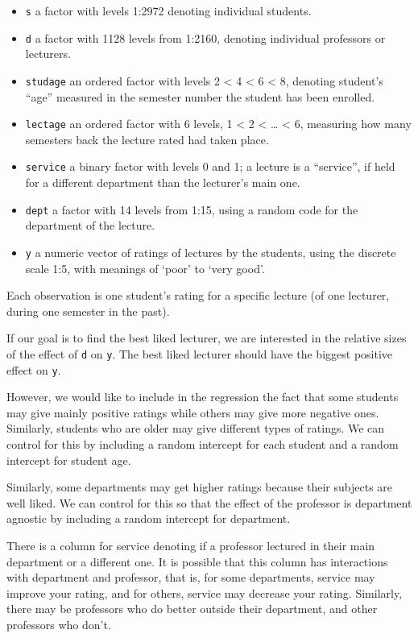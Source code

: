 \documentclass[
]{article}
\begin{document}
\begin{itemize}
\item
  \texttt{s} a factor with levels 1:2972 denoting individual students.
\item
  \texttt{d} a factor with 1128 levels from 1:2160, denoting individual
  professors or lecturers.
\item
  \texttt{studage} an ordered factor with levels 2 \textless{} 4
  \textless{} 6 \textless{} 8, denoting student's ``age'' measured in
  the semester number the student has been enrolled.
\item
  \texttt{lectage} an ordered factor with 6 levels, 1 \textless{} 2
  \textless{} \ldots{} \textless{} 6, measuring how many semesters back
  the lecture rated had taken place.
\item
  \texttt{service} a binary factor with levels 0 and 1; a lecture is a
  ``service'', if held for a different department than the lecturer's
  main one.
\item
  \texttt{dept} a factor with 14 levels from 1:15, using a random code
  for the department of the lecture.
\item
  \texttt{y} a numeric vector of ratings of lectures by the students,
  using the discrete scale 1:5, with meanings of `poor' to `very good'.
\end{itemize}

Each observation is one student's rating for a specific lecture (of one
lecturer, during one semester in the past).

If our goal is to find the best liked lecturer, we are interested in the
relative sizes of the effect of \texttt{d} on \texttt{y}. The best liked
lecturer should have the biggest positive effect on \texttt{y}.

However, we would like to include in the regression the fact that some
students may give mainly positive ratings while others may give more
negative ones. Similarly, students who are older may give different
types of ratings. We can control for this by including a random
intercept for each student and a random intercept for student age.

Similarly, some departments may get higher ratings because their
subjects are well liked. We can control for this so that the effect of
the professor is department agnostic by including a random intercept for
department.

There is a column for service denoting if a professor lectured in their
main department or a different one. It is possible that this column has
interactions with department and professor, that is, for some
departments, service may improve your rating, and for others, service
may decrease your rating. Similarly, there may be professors who do
better outside their department, and other professors who don't.
\end{document}
